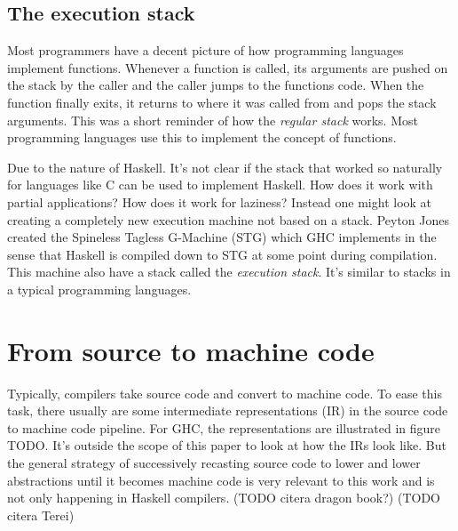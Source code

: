 \subsection{The execution stack}

Most programmers have a decent picture of how programming languages
implement functions. Whenever a function is called, its arguments are
pushed on the stack by the caller and the caller jumps to the functions
code. When the function finally exits, it returns to where it was called
from and pops the stack arguments. This was a short reminder of how
the \emph{regular stack} works. Most programming languages use this to
implement the concept of functions.

Due to the nature of Haskell. It's not clear if the stack that
worked so naturally for languages like C can be used to implement
Haskell. How does it work with partial applications? How does it
work for laziness? Instead one might look at creating a completely
new execution machine not based on a stack. Peyton Jones created the
Spineless Tagless G-Machine (STG) \cite{stg_1992} which GHC implements
\cite{evalapplyjfp06} in the sense that Haskell is compiled down to
STG at some point during compilation. This machine also have a stack
called the \emph{execution stack}. It's similar to stacks in a typical
programming languages.




\section{From source to machine code}

Typically, compilers take source code and convert to machine code. To ease this
task, there usually are some intermediate representations (IR) in the source
code to machine code pipeline.  For GHC, the representations are illustrated in
figure TODO. It's outside the scope of this paper to look at how the IRs
look like. But the general strategy of successively recasting source code to lower and
lower abstractions until it becomes machine code is very relevant to this work
and is not only happening in Haskell compilers. (TODO citera dragon book?) (TODO citera Terei)

